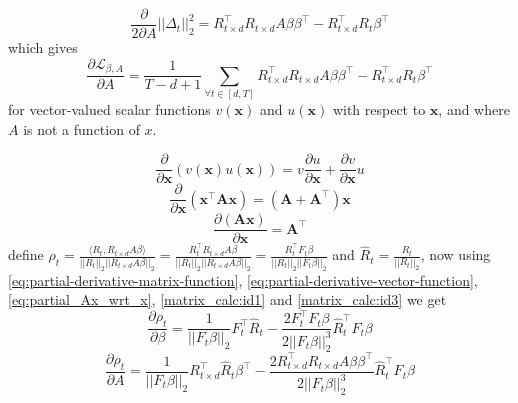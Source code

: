 \begin{equation}
    \frac{\partial}{2\partial A} ||\Delta_t||_2^2 = R_{t\times d}^\top R_{t\times d} A \beta \beta^\top - R_{t\times d}^\top R_t \beta^\top
\end{equation}
\newline which gives
\begin{equation}
    \frac{\partial \mathcal{L}_{\beta, A}}{\partial A} = \frac{1}{T-d+1} \sum_{\forall t\in [d,T]} R_{t\times d}^\top R_{t\times d} A \beta \beta^\top - R_{t\times d}^\top R_t \beta^\top
\end{equation}
\newline for vector-valued scalar functions $v(\mathbf{x})$ and $u(\mathbf{x})$ with respect to $\mathbf{x}$, and where $A$ is not a function of $x$.

\begin{equation}\label{eq:partial-derivative-vector-function}
\frac{\partial}{\partial \mathbf{x}} \left( v(\mathbf{x}) u(\mathbf{x}) \right) =  v \frac{\partial u}{\partial \mathbf{x}} + \frac{\partial v}{\partial \mathbf{x}} u
\end{equation}
\begin{equation}\label{eq:partial-derivative-matrix-function}
\frac{\partial}{\partial \mathbf{x}} (\mathbf{x}^{\top} \mathbf{A} \mathbf{x}) = (\mathbf{A} + \mathbf{A}^{\top}) \mathbf{x}
\end{equation}
\begin{equation}
\frac{\partial (\mathbf{Ax})}{\partial \mathbf{x}} = \mathbf{A}^\top \label{eq:partial_Ax_wrt_x}
\end{equation}
\newline define $\rho_t = \frac{\langle R_t,R_{t\times d} A  \beta\rangle}{||R_t||_2||R_{t\times d} A \beta||_2} = \frac{ R_t^\top R_{t\times d} A  \beta}{||R_t||_2||R_{t\times d} A \beta||_2} = \frac{ R_t^\top F_t \beta}{||R_t||_2||F_{t} \beta||_2}$ and $\hat{R}_t=\frac{R_t}{||R_t||_2}$, now using \ref{eq:partial-derivative-matrix-function}, \ref{eq:partial-derivative-vector-function}, \ref{eq:partial_Ax_wrt_x}, \ref{matrix_calc:id1} and \ref{matrix_calc:id3} we get
\begin{equation} \label{eq:derivative-rho_t_beta}
    \frac{\partial \rho_t}{\partial \beta} =  \frac{1}{||F_t\beta||_2}F_t^\top \hat{R}_t - \frac{2F_t^\top F_t \beta}{2||F_t\beta||_2^3}\hat{R}_t^\top F_t \beta
\end{equation}
\begin{equation} \label{eq:derivative-rho_t_A}
    \frac{\partial \rho_t}{\partial A} =  \frac{1}{||F_t\beta||_2} R_{t\times d}^\top \hat{R}_t \beta^\top - \frac{2R_{t\times d}^\top R_{t\times d} A \beta \beta^\top }{2||F_t\beta||_2^3}\hat{R}_t^\top F_t \beta
\end{equation}
